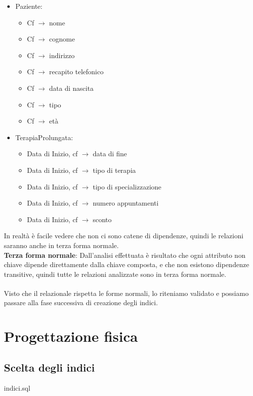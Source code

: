 \documentclass[11pt]{article}
\begin{document}
\begin{itemize}
    \item Paziente:
    \begin{itemize}
        \item Cf $\rightarrow$ nome
        \item Cf $\rightarrow$ cognome
        \item Cf $\rightarrow$ indirizzo
        \item Cf $\rightarrow$ recapito telefonico
        \item Cf $\rightarrow$ data di nascita
        \item Cf $\rightarrow$ tipo
        \item Cf $\rightarrow$ età
    \end{itemize}

    \item TerapiaProlungata:
    \begin{itemize}
        \item Data di Inizio, cf $\rightarrow$ data di fine
        \item Data di Inizio, cf $\rightarrow$ tipo di terapia
        \item Data di Inizio, cf $\rightarrow$ tipo di specializzazione
        \item Data di Inizio, cf $\rightarrow$ numero appuntamenti
        \item Data di Inizio, cf $\rightarrow$ sconto
    \end{itemize}
\end{itemize}

In realtà è facile vedere che non ci sono catene di dipendenze, quindi le relazioni saranno anche in terza forma normale.\\

\textbf{Terza forma normale}: Dall’analisi effettuata è risultato che ogni attributo non chiave dipende direttamente dalla chiave composta, 
e che non esistono dipendenze transitive, quindi tutte le relazioni analizzate sono in terza forma normale.\\
\\
Visto che il relazionale rispetta le forme normali, lo riteniamo validato e possiamo passare alla fase successiva di creazione degli indici.


\section{Progettazione fisica}
\subsection{Scelta degli indici}
indici.sql
\end{document}

